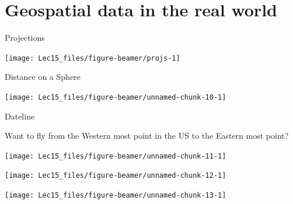 \documentclass[11pt,ignorenonframetext,]{beamer}
\begin{document}
\hypertarget{geospatial-data-in-the-real-world}{%
\section{Geospatial data in the real
world}\label{geospatial-data-in-the-real-world}}

\begin{frame}{Projections}
\protect\hypertarget{projections}{}

\begin{center}\texttt{[image: Lec15\_files/figure-beamer/projs-1]} \end{center}

\end{frame}

\begin{frame}{Distance on a Sphere}
\protect\hypertarget{distance-on-a-sphere}{}

\begin{center}\texttt{[image: Lec15\_files/figure-beamer/unnamed-chunk-10-1]} \end{center}

\end{frame}

\begin{frame}{Dateline}
\protect\hypertarget{dateline}{}

Want to fly from the Western most point in the US to the Eastern most
point?

\begin{center}\texttt{[image: Lec15\_files/figure-beamer/unnamed-chunk-11-1]} \end{center}

\end{frame}

\begin{frame}{}
\protect\hypertarget{section}{}

\begin{center}\texttt{[image: Lec15\_files/figure-beamer/unnamed-chunk-12-1]} \end{center}

\end{frame}

\begin{frame}{}
\protect\hypertarget{section-1}{}

\begin{center}\texttt{[image: Lec15\_files/figure-beamer/unnamed-chunk-13-1]} \end{center}

\end{frame}
\end{document}
